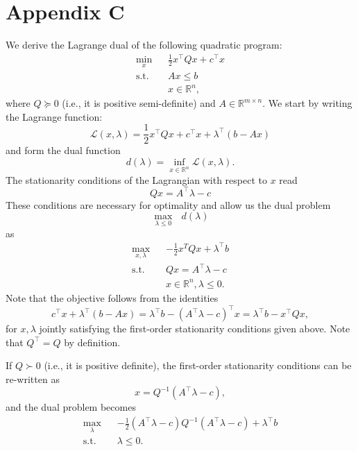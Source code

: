\documentclass{article}
\begin{document}
\section*{Appendix C}
We derive the Lagrange dual of the following quadratic program:
\begin{align*}
\underset{x}{\min} \hspace{10pt} & \frac{1}{2}x^\top Q x + c^\top x\\
\mbox{s.t. } & Ax \le b\\
&x \in \mathbb{R}^n,
\end{align*}
where $Q \succeq 0$ (i.e., it is positive semi-definite) and $A \in \mathbb{R}^{m \times n}$. We start by writing the Lagrange function:
\begin{equation*}
\mathcal{L}(x, \lambda) = \frac{1}{2}x^\top Q x + c^\top x + \lambda^\top(b - Ax)
\end{equation*}
and form the dual function
\begin{equation*}
d(\lambda) = \underset{x \in \mathbb{R}^n}{\inf} \mathcal{L}(x, \lambda).
\end{equation*}
The stationarity conditions of the Lagrangian with respect to $x$ read
\begin{equation*}
Qx = A^\top \lambda -c
\end{equation*}
These conditions are necessary for optimality and allow us the dual problem
\begin{equation*}
\underset{\lambda \le 0}{\max} \mbox{ }d(\lambda)
\end{equation*}
as
\begin{align*}
\underset{x, \lambda}{\max} \hspace{10pt} & -\frac{1}{2}x^T Q x + \lambda^\top b\\
\mbox{s.t. } & Qx = A^\top \lambda -c\\
&x \in \mathbb{R}^n, \lambda \le 0.
\end{align*}
Note that the objective follows from the identities
\begin{equation*}
c^\top x + \lambda^\top(b - Ax) = \lambda^\top b - (A^\top \lambda - c)^\top x =  \lambda^\top b - x^\top Q x,
\end{equation*}
for $x, \lambda$ jointly satisfying the first-order stationarity conditions given above. Note that $Q^\top = Q$ by definition. 

If $Q \succ 0$ (i.e., it is positive definite), the first-order stationarity conditions can be re-written as
\begin{equation*}
x = Q^{-1}(A^\top \lambda - c),
\end{equation*}
and the dual problem becomes
\begin{align*}
\underset{\lambda}{\max} \hspace{10pt} & -\frac{1}{2}(A^\top \lambda -c) Q^{-1} (A^\top \lambda -c) + \lambda^\top b\\
\mbox{s.t. } & \lambda \le 0.
\end{align*}



\end{document}
